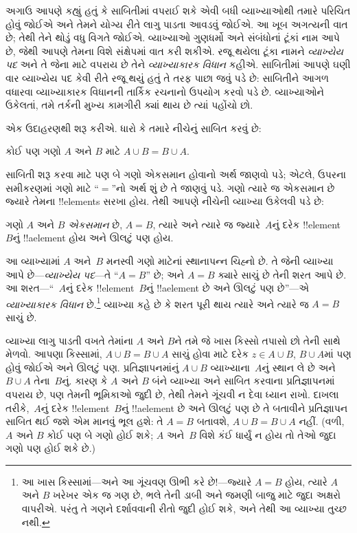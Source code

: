 \documentclass[../../../include/open-logic-section]{subfiles}
\begin{document}


અગાઉ આપણે કહ્યું હતું કે સાબિતીમાં વપરાઈ શકે એવી બધી વ્યાખ્યાઓથી
તમારે પરિચિત હોવું જોઈએ અને તેમને યોગ્ય રીતે લાગુ પાડતા આવડવું
જોઈએ. આ ખૂબ અગત્યની વાત છે; તેથી તેને થોડું વધુ વિગતે જોઈએ.
વ્યાખ્યાઓ ગુણધર્મો અને સંબંધોનાં ટૂંકાં નામ આપે છે, જેથી આપણે
તેમના વિશે સંક્ષેપમાં વાત કરી શકીએ. રજૂ થયેલા ટૂંકા નામને
\emph{વ્યાખ્યેય પદ} અને તે જેના માટે વપરાય છે તેને
\emph{વ્યાખ્યાકારક વિધાન} કહીએ. સાબિતીમાં આપણે ઘણી વાર
વ્યાખ્યેય પદ કેવી રીતે રજૂ થયું હતું તે તરફ પાછા જવું પડે છે:
સાબિતીને આગળ વધારવા વ્યાખ્યાકારક વિધાનની તાર્કિક રચનાનો ઉપયોગ
કરવો પડે છે. વ્યાખ્યાઓને ઉકેલતાં, તમે તર્કની મુખ્ય કામગીરી ક્યાં
થાય છે ત્યાં પહોંચો છો.

એક ઉદાહરણથી શરૂ કરીએ. ધારો કે તમારે નીચેનું સાબિત કરવું છે:

\begin{prop}
કોઈ પણ ગણો $A$ અને $B$ માટે $A \cup B = B \cup A$.
\end{prop}

સાબિતી શરૂ કરવા માટે પણ બે ગણો એકસમાન હોવાનો અર્થ જાણવો પડે;
એટલે, ઉપરના સમીકરણમાં ગણો માટે ``$=$''નો અર્થ શું છે તે જાણવું પડે.
ગણો ત્યારે જ એકસમાન છે જ્યારે તેમના !!{element}s સરખા હોય.
તેથી આપણે નીચેની વ્યાખ્યા ઉકેલવી પડે છે:

\begin{defn}
ગણો $A$ અને $B$ \emph{એકસમાન} છે, $A = B$, ત્યારે અને ત્યારે જ
જ્યારે~$A$નું દરેક !!{element}~$B$નું !!a{element} હોય અને ઊલટું પણ હોય.
\end{defn}

આ વ્યાખ્યામાં $A$ અને~$B$ મનસ્વી ગણો માટેનાં સ્થાનાપન્ન ચિહ્નો છે.
તે જેની વ્યાખ્યા આપે છે---\emph{વ્યાખ્યેય પદ}---તે ``$A = B$'' છે;
અને $A = B$ ક્યારે સાચું છે તેની શરત આપે છે. આ શરત---``~$A$નું દરેક
!!{element}~$B$નું !!a{element} છે અને ઊલટું પણ છે''---એ
\emph{વ્યાખ્યાકારક વિધાન} છે.\footnote{આ ખાસ કિસ્સામાં---અને આ
  ગૂંચવણ ઊભી કરે છે!---જ્યારે $A = B$ હોય, ત્યારે $A$ અને $B$
  ખરેખર એક જ ગણ છે, ભલે તેની ડાબી અને જમણી બાજુ માટે જુદા
  અક્ષરો વાપરીએ. પરંતુ તે ગણને દર્શાવવાની રીતો જુદી હોઈ શકે,
  અને તેથી આ વ્યાખ્યા તુચ્છ નથી.} વ્યાખ્યા કહે છે કે શરત પૂરી
થાય ત્યારે અને ત્યારે જ $A = B$ સાચું છે.

વ્યાખ્યા લાગુ પાડતી વખતે તેમાંના $A$ અને $B$ને તમે જે ખાસ
કિસ્સો તપાસો છો તેની સાથે મેળવો. આપણા કિસ્સામાં,
$A \cup B = B \cup A$ સાચું હોવા માટે દરેક $z \in A \cup B$,
$B \cup A$માં પણ હોવું જોઈએ અને ઊલટું પણ. પ્રતિજ્ઞાપનમાંનું
$A \cup B$ વ્યાખ્યાના~$A$નું સ્થાન લે છે અને $B \cup A$ તેના~$B$નું.
કારણ કે $A$ અને $B$ બંને વ્યાખ્યા અને સાબિત કરવાના પ્રતિજ્ઞાપનમાં
વપરાય છે, પણ તેમની ભૂમિકાઓ જુદી છે, તેથી તેમને ગૂંચવી ન દેવા
ધ્યાન રાખો. દાખલા તરીકે,~$A$નું દરેક !!{element}~$B$નું
!!a{element} છે અને ઊલટું પણ છે તે બતાવીને પ્રતિજ્ઞાપન સાબિત
થઈ જશે એમ માનવું ભૂલ હશે: તે $A = B$ બતાવશે, $A \cup B = B \cup A$
નહીં. (વળી, $A$ અને $B$ કોઈ પણ બે ગણો હોઈ શકે; $A$ અને~$B$
વિશે કંઈ ધાર્યું ન હોય તો તેઓ જુદા ગણો પણ હોઈ શકે છે.)
\end{document}
